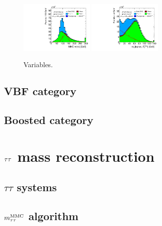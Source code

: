 \begin{figure}[tp]
  \includegraphics[width=0.32\textwidth]{figures/presel/mMMC}
  \includegraphics[width=0.32\textwidth]{figures/presel/mT-hi}
  \caption{Variables.}
  \label{fig:stategy-presel-2}
\end{figure}

\subsection{VBF category}
\label{sec:strategy-VBF}

\subsection{Boosted category}
\label{sec:strategy-boost}

\clearpage

\section{$\tau\tau$ mass reconstruction}
\label{sec:strategy-mtautau}

\subsection{$\tau\tau$ systems}
\label{sec:strategy-mtautau-intro}

\subsection{$m_{\tau\tau}^\text{MMC}$ algorithm}
\label{sec:strategy-mtautau-mMMC}

